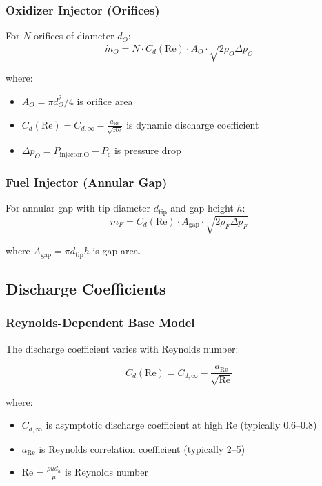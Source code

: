 \documentclass[12pt,a4paper]{article}
\newcommand{\mdot}{\dot{m}}
\newcommand{\Pc}{P_{\text{c}}}
\begin{document}
\subsubsection{Oxidizer Injector (Orifices)}

For $N$ orifices of diameter $d_O$:
\begin{equation}
\mdot_O = N \cdot C_d(\text{Re}) \cdot A_O \cdot \sqrt{2 \rho_O \Delta p_O}
\end{equation}

where:
\begin{itemize}
    \item $A_O = \pi d_O^2/4$ is orifice area
    \item $C_d(\text{Re}) = C_{d,\infty} - \frac{a_{\text{Re}}}{\sqrt{\text{Re}}}$ is dynamic discharge coefficient
    \item $\Delta p_O = P_{\text{injector,O}} - \Pc$ is pressure drop
\end{itemize}

\subsubsection{Fuel Injector (Annular Gap)}

For annular gap with tip diameter $d_{\text{tip}}$ and gap height $h$:
\begin{equation}
\mdot_F = C_d(\text{Re}) \cdot A_{\text{gap}} \cdot \sqrt{2 \rho_F \Delta p_F}
\end{equation}

where $A_{\text{gap}} = \pi d_{\text{tip}} h$ is gap area.

\subsection{Discharge Coefficients}

\subsubsection{Reynolds-Dependent Base Model}

The discharge coefficient varies with Reynolds number:

\begin{equation}
C_d(\text{Re}) = C_{d,\infty} - \frac{a_{\text{Re}}}{\sqrt{\text{Re}}}
\end{equation}

where:
\begin{itemize}
    \item $C_{d,\infty}$ is asymptotic discharge coefficient at high Re (typically 0.6--0.8)
    \item $a_{\text{Re}}$ is Reynolds correlation coefficient (typically 2--5)
    \item $\text{Re} = \frac{\rho u d_h}{\mu}$ is Reynolds number
\end{itemize}
\end{document}
